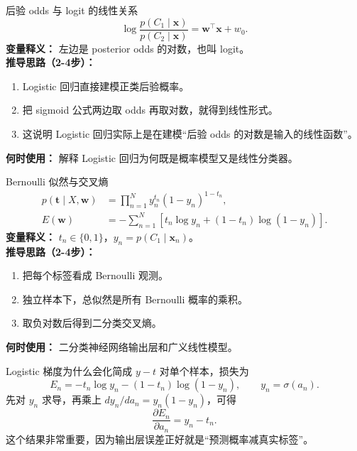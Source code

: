 ﻿\documentclass[11pt]{article}
\begin{document}
\begin{formulabox}{后验 odds 与 logit 的线性关系}
\begin{equation}
\log\frac{p(C_1\mid \mathbf x)}{p(C_2\mid \mathbf x)} = \mathbf w^\top\mathbf x + w_0.
\end{equation}
\textbf{变量释义：} 左边是 posterior odds 的对数，也叫 logit。\\
\textbf{推导思路（2-4步）：}
\begin{enumerate}[leftmargin=1.6em]
\item Logistic 回归直接建模正类后验概率。
\item 把 sigmoid 公式两边取 odds 再取对数，就得到线性形式。
\item 这说明 Logistic 回归实际上是在建模“后验 odds 的对数是输入的线性函数”。
\end{enumerate}
\textbf{何时使用：} 解释 Logistic 回归为何既是概率模型又是线性分类器。
\end{formulabox}
\begin{formulabox}{Bernoulli 似然与交叉熵}
\begin{align}
p(\mathbf t\mid X,\mathbf w)&=\prod_{n=1}^{N} y_n^{t_n}(1-y_n)^{1-t_n},\\
E(\mathbf w)&=-\sum_{n=1}^{N}\left[t_n\log y_n+(1-t_n)\log(1-y_n)\right].
\end{align}
\textbf{变量释义：} $t_n\in\{0,1\}$，$y_n=p(C_1\mid\mathbf x_n)$。\\
\textbf{推导思路（2-4步）：}
\begin{enumerate}[leftmargin=1.6em]
  \item 把每个标签看成 Bernoulli 观测。
  \item 独立样本下，总似然是所有 Bernoulli 概率的乘积。
  \item 取负对数后得到二分类交叉熵。
\end{enumerate}
\textbf{何时使用：} 二分类神经网络输出层和广义线性模型。
\end{formulabox}

\begin{derivationbox}{Logistic 梯度为什么会化简成 $y-t$}
对单个样本，损失为
\[
E_n=-t_n\log y_n-(1-t_n)\log(1-y_n),
\qquad y_n=\sigma(a_n).
\]
先对 $y_n$ 求导，再乘上 $dy_n/da_n=y_n(1-y_n)$，可得
\[
\frac{\partial E_n}{\partial a_n}=y_n-t_n.
\]
这个结果非常重要，因为输出层误差正好就是“预测概率减真实标签”。
\end{derivationbox}
\end{document}

